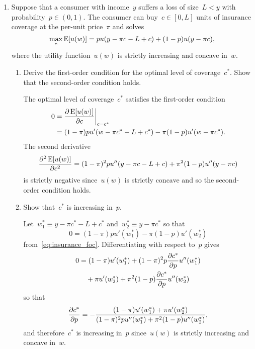 
\begin{enumerate}

	\item
	Suppose that a consumer with income~$y$ suffers a loss of size~$L<y$ with probability~$p\in(0,1)$.
	The consumer can buy~$c\in[0,L]$ units of insurance coverage at the per-unit price~$\pi$ and solves
	\[ \max_c\operatorname{E}[u(w)]=pu(y-\pi c-L+c)+(1-p)u(y-\pi c), \]
	where the utility function~$u(w)$ is strictly increasing and concave in~$w$.
	\begin{enumerate}

		\item
		Derive the first-order condition for the optimal level of coverage~$c^*$.
		Show that the second-order condition holds.
		\begin{solution}
			The optimal level of coverage~$c^*$ satisfies the first-order condition
			\begin{align}
				0
				&= \frac{\partial\operatorname{E}[u(w)]}{\partial c}\bigg\vert_{c=c^*}\\
				&= (1-\pi)pu'(w-\pi c^*-L+c^*)-\pi(1-p)u'(w-\pi c^*). \label{eq:insurance_foc}
			\end{align}
			The second derivative
			\[ \frac{\partial^2\operatorname{E}[u(w)]}{\partial c^2}=(1-\pi)^2pu''(y-\pi c-L+c)+\pi^2(1-p)u''(y-\pi c) \]
			is strictly negative since~$u(w)$ is strictly concave and so the second-order condition holds.
		\end{solution}

		\item
		Show that~$c^*$ is increasing in~$p$.
		\begin{solution}

			Let~$w_1^*\equiv y-\pi c^*-L+c^*$ and~$w_2^*\equiv y-\pi c^*$ so that
			\[ 0=(1-\pi)pu'(w_1^*)-\pi(1-p)u'(w_2^*) \label{eq:insurance_foc2} \]
			from~\eqref{eq:insurance_foc}.
			Differentiating with respect to~$p$ gives
			\begin{align}
				0
				&= (1-\pi)u'(w_1^*)+(1-\pi)^2p\frac{\partial c^*}{\partial p}u''(w_1^*)\\
					&\quad+\pi u'(w_2^*)+\pi^2(1-p)\frac{\partial c^*}{\partial p}u''(w_2^*)
			\end{align}
			so that
			\[ \frac{\partial c^*}{\partial p}=-\frac{(1-\pi)u'(w_1^*)+\pi u'(w_2^*)}{(1-\pi)^2pu''(w_1^*)+\pi^2(1-p)u''(w_2^*)}, \]
			and therefore~$c^*$ is increasing in~$p$ since~$u(w)$ is strictly increasing and concave in~$w$.

		\end{solution}


\end{enumerate}
\end{enumerate}

